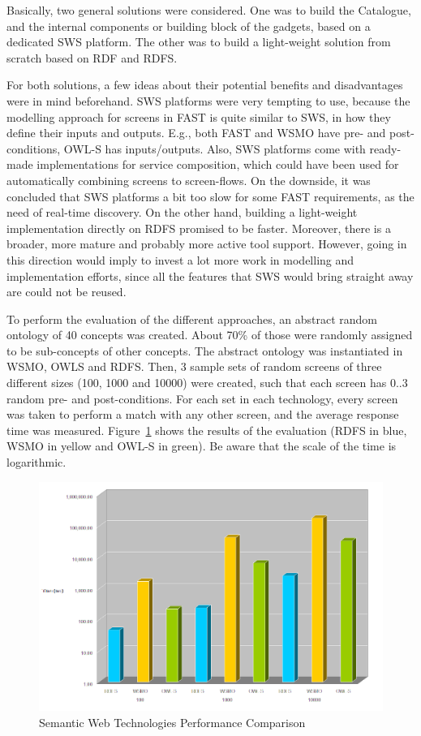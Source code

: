 \documentclass{fast_latex}
\begin{document}
Basically, two general solutions were considered. One was to build the Catalogue, and the internal components or building block of the gadgets, based on a dedicated SWS platform. The other was to build a light-weight solution from scratch based on RDF and RDFS.

For both solutions, a few ideas about their potential benefits and disadvantages were in mind beforehand. SWS platforms were very tempting to use, because the modelling approach for screens in FAST is quite similar to SWS, in how they define their inputs and outputs. E.g., both FAST and WSMO have pre- and post-conditions, OWL-S has inputs/outputs. Also, SWS platforms come with ready-made implementations for service composition, which could have been used for automatically combining screens to screen-flows. On the downside, it was concluded that SWS platforms a bit too slow for some FAST requirements, as the need of real-time discovery. On the other hand, building a light-weight implementation directly on RDFS promised to be faster. Moreover, there is a broader, more mature and probably more active tool support. However, going in this direction would imply to invest a lot more work in modelling and implementation efforts, since all the features that SWS would bring straight away are could not be reused.

To perform the evaluation of the different approaches, an abstract random ontology of 40 concepts was created. About 70\% of those were randomly assigned to be sub-concepts of other concepts. The abstract ontology was instantiated in WSMO, OWLS and RDFS. Then, 3 sample sets of random screens of three different sizes (100, 1000 and 10000) were created, such that each screen has 0..3 random pre- and post-conditions. For each set in each technology, every screen was taken to perform a match with any other screen, and the average response time was measured. Figure~\ref{fig:comparison_chart} shows the results of the evaluation (RDFS in blue, WSMO in yellow and OWL-S in green). Be aware that the scale of the time is logarithmic.

\begin{figure}[htb]
\label{fig:comparison_chart}
\begin{center}
	\includegraphics[width=14cm]{images/comparison_chart}
	\caption{Semantic Web Technologies Performance Comparison}
\end{center}
\end{figure}
\end{document}
